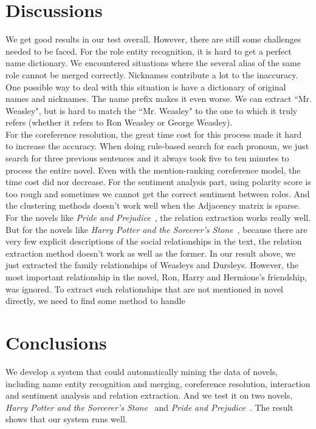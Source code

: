\documentclass[11pt]{article}
\begin{document}
\section{Discussions} %
We get good results in our test overall. However, there are still some challenges needed to be faced. For the role entity recognition, it is hard to get a perfect name dictionary. We encountered situations where the several alias of the same role cannot be merged correctly. Nicknames contribute a lot to the inaccuracy. One possible way to deal with this situation is have a dictionary of original names and nicknames. The name prefix makes it even worse. We can extract ``Mr. Weasley", but is hard to match the ``Mr. Weasley" to the one to which it truly refers (whether it refers to Ron Weasley or George Weasley). \\
For the coreference resolution, the great time cost for this process made it hard to increase the accuracy. When doing rule-based search for each pronoun, we just search for three previous sentences and it always took five to ten minutes to process the entire novel. Even with the mention-ranking coreference model, the time cost did nor decrease.
For the sentiment analysis part, using polarity score is too rough and sometimes we cannot get the correct sentiment between roles. And the clustering methods doesn't work well when the Adjacency matrix is sparse. \\
For the novels like \textit{Pride and Prejudice}~\cite{pride}, the relation extraction works really well. But for the novels like \textit{Harry Potter and the Sorcerer's Stone}~\cite{harrypotter}, because there are very few explicit descriptions of the social relationships in the text, the relation extraction method doesn't work as well as the former. In our result above, we just extracted the family relationships of Weasleys and Dursleys. However, the most important relationship in the novel, Ron, Harry and Hermione's friendship, was ignored. To extract such relationships that are not mentioned in novel directly, we need to find some method to handle 

\section{Conclusions} %
\label{sec:length}
We develop a system that could automatically mining the data of novels, including name entity recognition and merging, coreference resolution, interaction and sentiment analysis and relation extraction. And we test it on two novels, \textit{Harry Potter and the Sorcerer's Stone}~\cite{harrypotter} and \textit{Pride and Prejudice}~\cite{pride}. The result shows that our system runs well.
\end{document}
